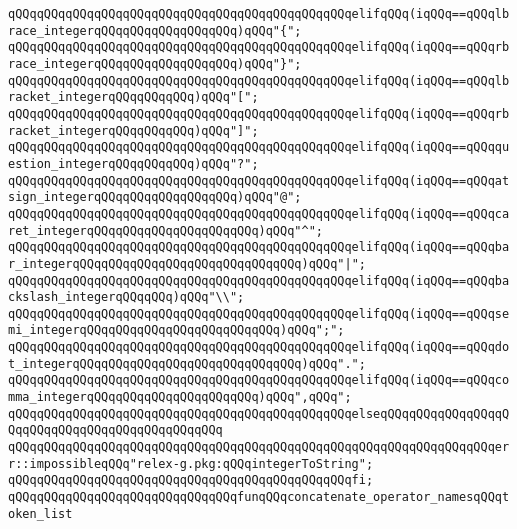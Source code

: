 \verb|qQQqqQQqqQQqqQQqqQQqqQQqqQQqqQQqqQQqqQQqqQQqqQQqelifqQQq(iqQQq==qQQqlbrace_integerqQQqqQQqqQQqqQQqqQQq)qQQq"{";|\newline
\verb|qQQqqQQqqQQqqQQqqQQqqQQqqQQqqQQqqQQqqQQqqQQqqQQqelifqQQq(iqQQq==qQQqrbrace_integerqQQqqQQqqQQqqQQqqQQq)qQQq"}";|\newline
\verb|qQQqqQQqqQQqqQQqqQQqqQQqqQQqqQQqqQQqqQQqqQQqqQQqelifqQQq(iqQQq==qQQqlbracket_integerqQQqqQQqqQQq)qQQq"[";|\newline
\verb|qQQqqQQqqQQqqQQqqQQqqQQqqQQqqQQqqQQqqQQqqQQqqQQqelifqQQq(iqQQq==qQQqrbracket_integerqQQqqQQqqQQq)qQQq"]";|\newline
\verb|qQQqqQQqqQQqqQQqqQQqqQQqqQQqqQQqqQQqqQQqqQQqqQQqelifqQQq(iqQQq==qQQqquestion_integerqQQqqQQqqQQq)qQQq"?";|\newline
\verb|qQQqqQQqqQQqqQQqqQQqqQQqqQQqqQQqqQQqqQQqqQQqqQQqelifqQQq(iqQQq==qQQqatsign_integerqQQqqQQqqQQqqQQqqQQq)qQQq"@";|\newline
\verb|qQQqqQQqqQQqqQQqqQQqqQQqqQQqqQQqqQQqqQQqqQQqqQQqelifqQQq(iqQQq==qQQqcaret_integerqQQqqQQqqQQqqQQqqQQqqQQq)qQQq"^";|\newline
\verb|qQQqqQQqqQQqqQQqqQQqqQQqqQQqqQQqqQQqqQQqqQQqqQQqelifqQQq(iqQQq==qQQqbar_integerqQQqqQQqqQQqqQQqqQQqqQQqqQQqqQQq)qQQq"|\verb#|";#\newline
\verb|qQQqqQQqqQQqqQQqqQQqqQQqqQQqqQQqqQQqqQQqqQQqqQQqelifqQQq(iqQQq==qQQqbackslash_integerqQQqqQQq)qQQq"\\";|\newline
\verb|qQQqqQQqqQQqqQQqqQQqqQQqqQQqqQQqqQQqqQQqqQQqqQQqelifqQQq(iqQQq==qQQqsemi_integerqQQqqQQqqQQqqQQqqQQqqQQqqQQq)qQQq";";|\newline
\verb|qQQqqQQqqQQqqQQqqQQqqQQqqQQqqQQqqQQqqQQqqQQqqQQqelifqQQq(iqQQq==qQQqdot_integerqQQqqQQqqQQqqQQqqQQqqQQqqQQqqQQq)qQQq".";|\newline
\verb|qQQqqQQqqQQqqQQqqQQqqQQqqQQqqQQqqQQqqQQqqQQqqQQqelifqQQq(iqQQq==qQQqcomma_integerqQQqqQQqqQQqqQQqqQQqqQQq)qQQq",qQQq";|\newline
\verb|qQQqqQQqqQQqqQQqqQQqqQQqqQQqqQQqqQQqqQQqqQQqqQQqelseqQQqqQQqqQQqqQQqqQQqqQQqqQQqqQQqqQQqqQQqqQQqqQQq|\newline
\verb|qQQqqQQqqQQqqQQqqQQqqQQqqQQqqQQqqQQqqQQqqQQqqQQqqQQqqQQqqQQqqQQqqQQqerr::impossibleqQQq"relex-g.pkg:qQQqintegerToString";|\newline
\verb|qQQqqQQqqQQqqQQqqQQqqQQqqQQqqQQqqQQqqQQqqQQqqQQqfi;|\newline
\newline
\verb|qQQqqQQqqQQqqQQqqQQqqQQqqQQqqQQqfunqQQqconcatenate_operator_namesqQQqtoken_list|\newline
